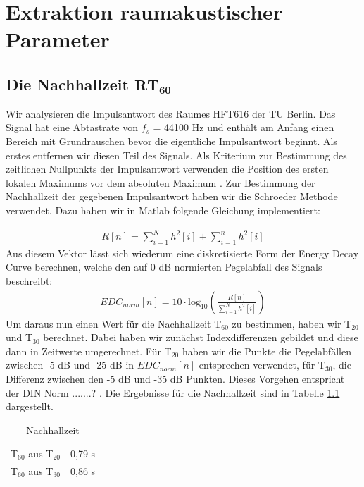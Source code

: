 \chapter{Extraktion raumakustischer Parameter}
\section{Die Nachhallzeit $\mathbf{RT_{60}}$}
\label{sec:rt60}Wir analysieren die Impulsantwort des Raumes HFT616 der TU Berlin.
Das Signal hat eine Abtastrate von $f_s$ = 44100 Hz und enthält am Anfang einen Bereich mit Grundrauschen bevor die eigentliche Impulsantwort beginnt.
Als erstes entfernen wir diesen Teil des Signals.
Als Kriterium zur Bestimmung des zeitlichen Nullpunkts der Impulsantwort verwenden die Position des ersten lokalen Maximums vor dem absoluten Maximum .
Zur Bestimmung der Nachhallzeit der gegebenen Impulsantwort haben wir die Schroeder Methode \cite{Schroeder65} verwendet.
Dazu haben wir in Matlab folgende Gleichung implementiert:

\begin{align*}
R[n] = \sum_{i=1}^N h^2[i] + \sum_{i=1}^n h^2[i]
\end{align*}
Aus diesem Vektor lässt sich wiederum eine diskretisierte Form der Energy Decay Curve berechnen, welche den auf 0 dB normierten Pegelabfall des Signals  beschreibt:
\begin{align*}
EDC_{norm}[n] = 10 \cdot \mathrm{log}_{10} \left(\frac{R[n]}{\sum_{i=1}^N h^2[i]}\right)
\end{align*}
Um daraus nun einen Wert für die Nachhallzeit T$_{60}$ zu bestimmen, haben wir T$_{20}$ und T$_{30}$ berechnet.
Dabei haben wir zunächst Indexdifferenzen gebildet und diese dann in Zeitwerte umgerechnet.
Für T$_{20}$ haben wir die Punkte die Pegelabfällen zwischen -5 dB und -25 dB in $EDC_{norm}[n]$ entsprechen verwendet, für T$_{30}$, die Differenz zwischen den -5 dB und -35 dB Punkten.
Dieses Vorgehen entspricht der DIN Norm .......? .
Die Ergebnisse für die Nachhallzeit sind in Tabelle \ref{tab:T} dargestellt.

\begin{table}[H]
\centering
\caption{Nachhallzeit}
\label{tab:T}
\begin{tabular}{ | c | c |}
  \hline
  T$_{60}$ aus T$_{20}$ &  0,79 s \\
  T$_{60}$ aus T$_{30}$ &  0,86 s \\
  \hline
  \end{tabular}
\end{table}


